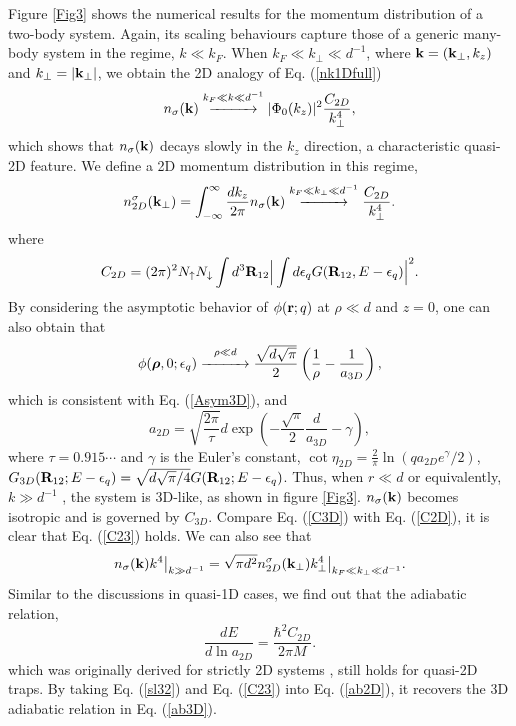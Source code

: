 \documentclass[twocolumn, prl]{revtex4}
\begin{document}
Figure \ref{Fig3} shows the numerical results for the momentum distribution of a two-body system. Again, its scaling behaviours capture those of a generic many-body system in the regime, $k\ll k_F$. When $k_F\ll k_\bot \ll d^{-1}$,  where ${\bf k}=({\bf k}_\bot, k_z)$ and $k_\bot =|{\bf k}_\bot|$, we obtain the 2D analogy of Eq. (\ref{nk1Dfull})
\begin{equation}
n_\sigma({\bf k}) \stackrel{ k_F\ll k\ll  d^{-1}}{\xrightarrow{\hspace*{1cm}} } |\Phi_{0}(k_z)|^2\frac{ C_{2D}}{k_\bot^{4}},
\end{equation}
which shows that $n_\sigma({\bf k})$ decays slowly in the $k_z$ direction, a characteristic quasi-2D feature.  We define a 2D momentum distribution in this regime, 
\begin{equation}
n_{2D}^\sigma({\bf k}_\bot)=\int_{-\infty}^{\infty}  \frac{dk_z}{2\pi} n_\sigma({\bf k}) \stackrel{k_F\ll k_\bot \ll d^{-1}}{\xrightarrow{\hspace*{1cm}} } \frac{C_{2D}}{k_\bot^4}.
\label{2Dnk}
\end{equation}
where
\begin{equation}
C_{2D}=(2\pi)^2 N_{\uparrow}N_{\downarrow}\int d^3 {\bf R}_{12} \Big|\int d\epsilon_q G({\bf R}_{12},E-\epsilon_q)\Big|^2.\label{C2D}
\end{equation}
By considering the asymptotic behavior of $\phi({\bf r};q)$ at $\rho \ll d$ and $z=0$, one can also obtain that
\begin{equation}
\phi({\bm \rho},0;\epsilon_q)  \stackrel{ \rho \ll d }{\xrightarrow{\hspace*{1cm}} }  \frac{\sqrt{d\sqrt{\pi}  }}{2} \left( \frac{1}{\rho} - \frac{1}{a_{3D}} \right), \label{Asym3D2D}
\end{equation} 
which is consistent with Eq. (\ref{Asym3D}), and \cite{Petrov}
\begin{equation}
a_{2D}=\sqrt{\frac{2\pi}{\tau}} d \exp{\left(-\frac{\sqrt{\pi}}{2} \frac{d}{a_{3D}} - \gamma \right)}, \label{sl32}
\end{equation}
where $\tau=0.915\cdots$ and $\gamma$ is the Euler's constant,  $\cot{\eta_{2D}}=\frac{2}{\pi} \ln{\left(qa_{2D}e^\gamma/2\right)}$, $G_{3D}({\bf R}_{12};E-\epsilon_q)= \sqrt{d\sqrt{\pi}/4} G({\bf R}_{12};E-\epsilon_q)$. Thus, when $r\ll d$ or equivalently, $k\gg d^{-1}$ , the system is 3D-like, as shown in figure \ref{Fig3}. $n_\sigma({\bf k})$ becomes isotropic and is governed by $C_{3D}$. Compare Eq. (\ref{C3D}) with Eq. (\ref{C2D}), it is clear that Eq. (\ref{C23}) holds. We can also see that
\begin{equation}
n_\sigma({\bf k})k^4\big|_{k\gg d^{-1}}=\sqrt{\pi d^2} n_{2D}^\sigma({\bf k}_\bot){k_\bot^4}\big|_{k_F\ll k_\bot\ll d^{-1}}.
\end{equation}
Similar to the discussions in quasi-1D cases, we find out that the adiabatic relation, 
\begin{equation}
\frac{dE}{d\ln{a_{2D}}}=\frac{\hbar^2C_{2D}}{2\pi M}. \label{ab2D}
\end{equation}
which was originally derived for strictly 2D systems \cite{V3}, still holds for quasi-2D traps. By taking Eq. (\ref{sl32}) and Eq. (\ref{C23}) into Eq. (\ref{ab2D}), it recovers the 3D adiabatic relation in Eq. (\ref{ab3D}).
\end{document}
